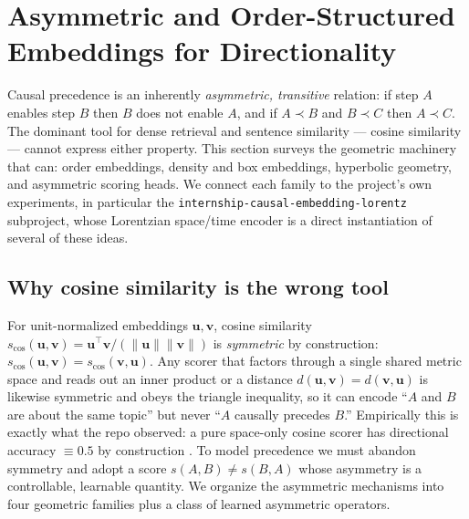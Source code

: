 \section{Asymmetric and Order-Structured Embeddings for Directionality}
\label{sec:asymmetric_geometry}

Causal precedence is an inherently \emph{asymmetric, transitive} relation: if
step $A$ enables step $B$ then $B$ does not enable $A$, and if $A \prec B$ and
$B \prec C$ then $A \prec C$. The dominant tool for dense retrieval and
sentence similarity --- cosine similarity --- cannot express either property.
This section surveys the geometric machinery that can: order embeddings,
density and box embeddings, hyperbolic geometry, and asymmetric scoring heads.
We connect each family to the project's own experiments, in particular the
\texttt{internship-causal-embedding-lorentz} subproject, whose Lorentzian
space/time encoder is a direct instantiation of several of these ideas.

\subsection{Why cosine similarity is the wrong tool}
For unit-normalized embeddings $\mathbf{u},\mathbf{v}$, cosine similarity
$s_{\cos}(\mathbf{u},\mathbf{v}) = \mathbf{u}^\top \mathbf{v}/(\lVert
\mathbf{u}\rVert \lVert \mathbf{v}\rVert)$ is \emph{symmetric} by construction:
$s_{\cos}(\mathbf{u},\mathbf{v}) = s_{\cos}(\mathbf{v},\mathbf{u})$. Any scorer
that factors through a single shared metric space and reads out an inner
product or a distance $d(\mathbf{u},\mathbf{v}) = d(\mathbf{v},\mathbf{u})$ is
likewise symmetric and obeys the triangle inequality, so it can encode
``$A$ and $B$ are about the same topic'' but never ``$A$ causally precedes
$B$.'' Empirically this is exactly what the repo observed: a pure space-only
cosine scorer has directional accuracy $\equiv 0.5$ by construction
\citep{geo:repo_lorentz2026}. To model precedence we must abandon symmetry and
adopt a score $s(A,B)\neq s(B,A)$ whose asymmetry is a controllable, learnable
quantity. We organize the asymmetric mechanisms into four geometric families
plus a class of learned asymmetric operators.

